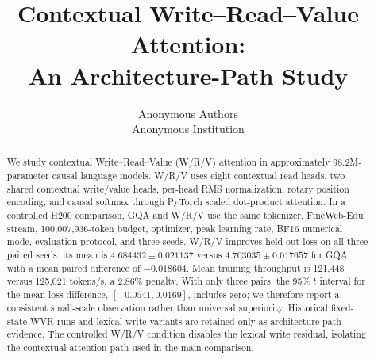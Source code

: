 \documentclass[10pt]{article}
\title{Contextual Write--Read--Value Attention:\\An Architecture-Path Study}
\author{\name Anonymous Authors \\
        \addr Anonymous Institution}
\begin{document}
\maketitle

\begin{abstract}
We study contextual Write--Read--Value (W/R/V) attention in approximately 98.2M-parameter causal language models. W/R/V uses eight contextual read heads, two shared contextual write/value heads, per-head RMS normalization, rotary position encoding, and causal softmax through PyTorch scaled dot-product attention. In a controlled H200 comparison, GQA and W/R/V use the same tokenizer, FineWeb-Edu stream, 100,007,936-token budget, optimizer, peak learning rate, BF16 numerical mode, evaluation protocol, and three seeds. W/R/V improves held-out loss on all three paired seeds: its mean is $4.684432\pm0.021137$ versus $4.703035\pm0.017657$ for GQA, with a mean paired difference of $-0.018604$. Mean training throughput is 121,448 versus 125,021 tokens/s, a 2.86\% penalty. With only three pairs, the 95\% $t$ interval for the mean loss difference, $[-0.0541,0.0169]$, includes zero; we therefore report a consistent small-scale observation rather than universal superiority. Historical fixed-state WVR runs and lexical-write variants are retained only as architecture-path evidence. The controlled W/R/V condition disables the lexical write residual, isolating the contextual attention path used in the main comparison.
\end{abstract}












\appendix

\end{document}

